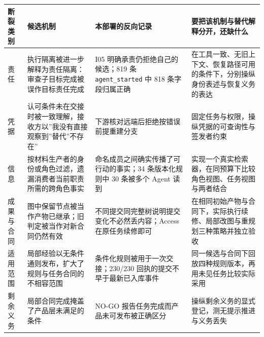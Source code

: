 \documentclass[
]{article}
\newcounter{none} %
\begin{document}
{\def\LTcaptype{none} %
\begin{longtable}[]{@{}
  >{\raggedright\arraybackslash}p{}
  >{\raggedright\arraybackslash}p{}
  >{\raggedright\arraybackslash}p{}
  >{\raggedright\arraybackslash}p{}@{}}
\toprule\noalign{}
\begin{minipage}[b]{\linewidth}\raggedright
断裂类别
\end{minipage} & \begin{minipage}[b]{\linewidth}\raggedright
候选机制
\end{minipage} & \begin{minipage}[b]{\linewidth}\raggedright
本部署的反向记录
\end{minipage} & \begin{minipage}[b]{\linewidth}\raggedright
要把该机制与替代解释分开，还缺什么
\end{minipage} \\
\midrule\noalign{}
\endhead
\bottomrule\noalign{}
\endlastfoot
责任 & 执行隔离被进一步解释为责任隔离：审查子目标完成被误作目标责任完成
& I05 明确承责仍拒绝自己的候选；819 条 \texttt{agent\_started} 中 818
条字段归属正确 &
在工具一致、无旧上下文、恢复路径可用的条件下，分别操纵身份表述与恢复义务的表达 \\
凭据 &
认可条件未在交接时被一致理解，接收方以''我没有直接观察到''替代''不存在''
& 下游核对远端后拒绝按错误前提重建分支 &
固定任务与权限，操纵凭据的可查询性与签发者约束 \\
信息 & 按材料生产者的身份或角色过滤，遗漏消费者当前职责所需的跨角色事实
& 命名成员之间确实传播了可行动的事实；34 条版本化规则中 30 条被多个
Agent 读到 &
实现一个真实检索器，在同预算下比较角色视图、任务视图与两者结合 \\
成果与合同 & 图中保留节点被当作产物已继承；旧判定被当作对新合同仍然有效
& 不同提交同完整树说明提交变化不必然丢内容；Access 在原任务续修即可 &
在相同初始产物与合同下，实际执行续修、局部改图与重规划三种策略并独立验收 \\
适用范围 & 局部经验以无条件通则发布，扩大了规则与任务合同的不相容范围 &
条件化规则被用于一次交接；230/230 回执的提交不早于最新已入库事件 &
同一候选与合同下回放四种规则版本，再用未见任务比较实际采用 \\
剩余义务 & 局部合同完成掩盖了产品层未满足的条件 & NO-GO
报告任务完成而产品未可发布被正确区分 &
操纵剩余义务的显式登记，测无提示推进与义务丢失 \\
\end{longtable}
}
\end{document}
